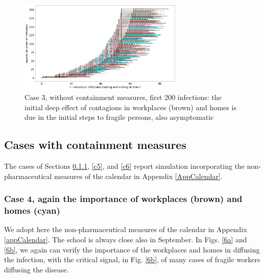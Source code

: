 \documentclass[11pt]{article}
\begin{document}
\begin{figure}[H]
\begin{center}
\includegraphics[width=0.7\textwidth]{no5b.png}%
\caption{Case 3, without containment measures, first 200 infections: the initial deep effect of contagions in workplaces (brown) and homes is due in the initial steps to fragile persons, also asymptomatic}
\label{5b}
\end{center}
\end{figure}

\subsection{Cases with containment measures}

The cases of Sections \ref{c4}, \ref{c5}, and \ref {c6} report simulation incorporating the non-pharmaceutical measures of the calendar in Appendix \ref{AppCalendar}.

\subsubsection{Case 4, again the importance of workplaces (brown) and homes (cyan)}
\label{c4}

We adopt here the non-pharmaceutical measures of the calendar in Appendix \ref{appCalendar}. The school is always close also in September. 
In Figs. \ref{6a} and \ref{6b}, we again can verify the importance of the workplaces and homes in diffusing the infection, with the critical signal, in Fig. \ref{6b}, of many cases of fragile workers diffusing the disease.
\end{document}
